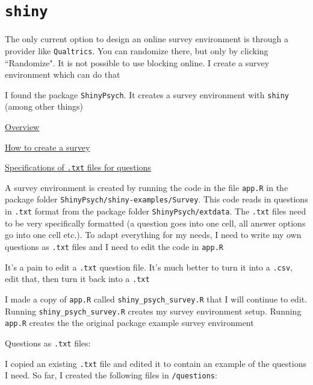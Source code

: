 \documentclass[12pt]{article}
\begin{document}
\section*{\texttt{shiny}}
	\begin{coi}
		\item The only current option to design an online survey environment is through a provider like \texttt{Qualtrics}. You can randomize there, but only by clicking ``Randomize". It is not possible to use blocking online. I create a survey environment which can do that
		\item I found the package {\tt ShinyPsych}. It creates a survey environment with {\tt shiny} (among other things)
			\begin{coi}
				\item \href{http://rstudio-pubs-static.s3.amazonaws.com/302907_9491d773d4f147c3ac8e0b29d301846a.html#about_shinypsych}{Overview}
				\item \href{http://rstudio-pubs-static.s3.amazonaws.com/302891_3a8f5170171545248977bbb7b015f546.html#what_is_this_tutorial_about}{How to create a survey}
				\item \href{http://rpubs.com/msteiner/ShinyPsych_TextfileTutorial}{Specifications of {\tt .txt} files for questions}
			\end{coi}
		\item A survey environment is created by running the code in the file {\tt app.R} in the package folder {\tt ShinyPsych/shiny-examples/Survey}. This code reads in questions in {\tt .txt} format from the package folder {\tt ShinyPsych/extdata}. The {\tt .txt} files need to be very specifically formatted (a question goes into one cell, all answer options go into one cell etc.). To adapt everything for my needs, I need to write my own questions as {\tt .txt} files and I need to edit the code in {\tt app.R}
		\item  It's a pain to edit a {\tt .txt} question file. It's much better to turn it into a {\tt .csv}, edit that, then turn it back into a {\tt .txt}
		\item I made a copy of {\tt app.R} called {\tt shiny\_psych\_survey.R} that I will continue to edit. Running {\tt shiny\_psych\_survey.R} creates my survey environment setup. Running {\tt app.R} creates the the original package example survey environment
		\item Questions as {\tt .txt} files:
			\begin{coi}
				\item I copied an existing {\tt .txt} file and edited it to contain an example of the questions I need. So far, I created the following files in {\tt /questions}:

\end{coi}
\end{coi}
\end{document}
